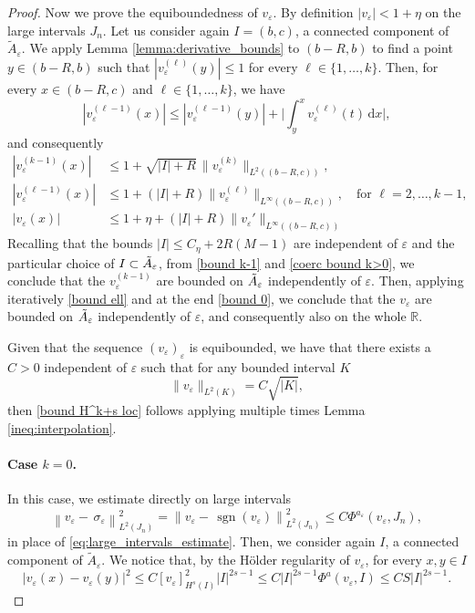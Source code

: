 \documentclass{article}
\theoremstyle{definition}
\newcommand{\norm}[1]{\left\lVert #1 \right\rVert}
\newcommand{\de}{\mathrm{d}}
\newcommand{\R}{\mathbb{R}}
\newcommand{\e}{\varepsilon}
\def\e{\varepsilon}
\newcommand{\sgn}{\operatorname{sgn}}
\begin{document}
\begin{proof}
Now we prove the equiboundedness of $v_\e$. By definition $|v_\e|<1+\eta$ on the large intervals $J_n$.
Let us consider again $I=(b,c)$, a connected component of $\tilde A_\e$. We apply  Lemma \ref{lemma:derivative_bounds} to $(b-R,b)$ to find a point $y\in (b-R,b)$ such that $|v^{(\ell)}_\e(y)|\leq 1$ for every $\ell \in\{1,\dots,k\} $. Then, for every $x\in (b-R,c)$ and $\ell \in \{1,\dots,k\}$, we have
 \begin{equation*}
         |v_\e^{(\ell-1)}(x)|\leq |v^{(\ell-1)}_\e(y)|+ \Big|\int_y^xv_\e^{(\ell)}(t)\,\de x\Big|,
 \end{equation*}
 and consequently
 \begin{align}
    \label{bound k-1} |v_\e^{(k-1)}(x)|&\leq 1 + \sqrt{|I|+R}\,\|v_\e^{(k)}\|_{L^2((b-R,c))},\\
    \label{bound ell} |v_\e^{(\ell-1)}(x)|&\leq 1 + (|I|+R)\|v_\e^{(\ell)}\|_{L^\infty((b-R,c))},\quad \text{for }\ell=2,\dots, k-1,\\
    \label{bound 0} |v_\e(x)|&\leq 1 + \eta + (|I|+R)\|v_\e'\|_{L^\infty((b-R,c))}
 \end{align}
Recalling that the bounds $|I|\leq C_\eta + 2R(M-1)$ are independent of $\e$ and the particular choice of $I\subset \Tilde{A}_\e$, from \eqref{bound k-1} and \eqref{coerc bound k>0}, we conclude that the $v_\e^{(k-1)}$ are bounded on $\Tilde{A}_\e$ independently of $\e$. 
Then, applying iteratively \eqref{bound ell} and at the end \eqref{bound 0}, we conclude that the $v_\e$ are bounded on $\Tilde{A}_\e$ independently of $\e$, and consequently also on the whole $\R$. 

Given that the sequence $(v_\e)_\e$ is equibounded, we have that there exists a $C>0$ independent of $\e$ such that for any bounded interval $K$
\[\|v_\e\|_{L^2(K)} = C\sqrt{|K|},\]
then \eqref{bound H^k+s loc} follows applying multiple times Lemma \ref{ineq:interpolation}.


    \paragraph{Case $k=0$.} In this case, we estimate directly on large intervals
    \begin{equation}
    \label{k=0 bound large inetrv}
        \norm{v_\e-\,\sigma_\e}^2_{L^2(J_n)} = \norm{v_\e-\,\sgn(v_\e)}^2_{L^2(J_n)}\leq C\Phi^{a_{\scriptstyle \e}}(v_\e,J_n),
    \end{equation}
    in place of \eqref{eq:large_intervals_estimate}.
    Then, we consider again $I$, a connected component of $\widetilde{A}_\e$. We notice that, by the Hölder regularity of $v_\e$, for every $x,y\in I$
    $$|v_\e(x)-v_\e(y)|^2 \leq C [v_\e]^2_{H^s(I)}|I|^{2s-1}\leq C|I|^{2s-1}\Phi^a(v_\e,I)\leq CS|I|^{2s-1}.$$ 
    

\end{proof}
\end{document}
